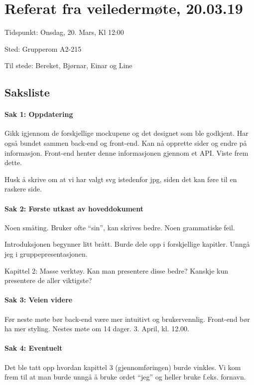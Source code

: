 \chapter{Referat fra veiledermøte, 20.03.19}

Tidspunkt: Onsdag, 20. Mars, Kl 12:00

Sted: Grupperom A2-215

Til stede: Bereket, Bjørnar, Einar og Line

\section{Saksliste}

\subsubsection{Sak 1: Oppdatering}
Gikk igjennom de forskjellige mockupene og det designet som ble godkjent. Har også bundet sammen back-end og front-end. Kan nå opprette sider og endre på informasjon. Front-end henter denne informasjonen gjennom et API. Viste frem dette.

Husk å skrive om at vi har valgt svg istedenfor jpg, siden det kan føre til en raskere side. 

\subsubsection{Sak 2: Første utkast av hoveddokument}
Noen småting. Bruker ofte “sin”, kan skrives bedre. Noen grammatiske feil. 

Introduksjonen begynner litt brått. Burde dele opp i forskjellige kapitler. Unngå jeg i gruppepresentasjonen.

Kapittel 2: Masse verktøy. Kan man presentere disse bedre? Kanskje kun presentere de aller viktigste?

\subsubsection{Sak 3: Veien videre}
Før neste møte bør back-end være mer intuitivt og brukervennlig. Front-end bør ha mer styling. Nestes møte om 14 dager. 3. April, kl. 12.00.

\subsubsection{Sak 4: Eventuelt}
Det ble tatt opp hvordan kapittel 3 (gjennomføringen) burde vinkles. Vi kom frem til at man burde unngå å bruke ordet “jeg” og heller bruke f.eks. fornavn.

